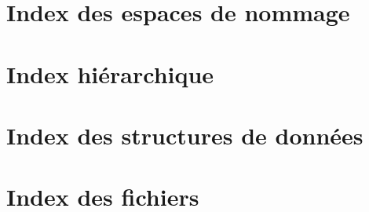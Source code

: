 \documentclass[twoside]{book}
\newcommand{\+}{\discretionary{\mbox{\scriptsize$\hookleftarrow$}}{}{}}
\begin{document}



















\chapter{Index des espaces de nommage}

\chapter{Index hiérarchique}

\chapter{Index des structures de données}

\chapter{Index des fichiers}

\end{document}
